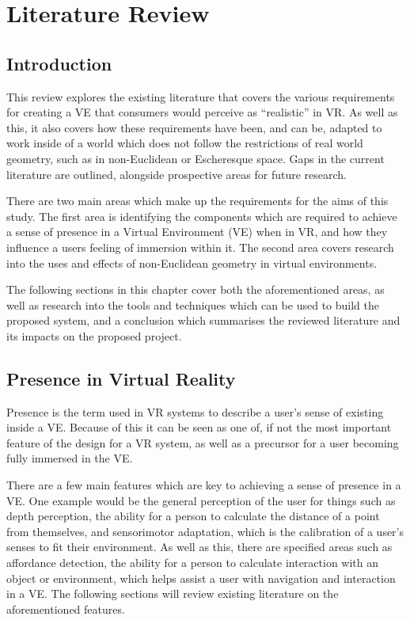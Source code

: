 \chapter{Literature Review}
\label{lr}

	\section{Introduction}
	\label{lr:intro}

		This review explores the existing literature that covers the various requirements for creating a VE that consumers would perceive as \enquote{realistic} in VR.
		As well as this, it also covers how these requirements have been, and can be, adapted to work inside of a world which does not follow the restrictions of real world geometry, such as in non-Euclidean or Escheresque space.
		Gaps in the current literature are outlined, alongside prospective areas for future research.

		There are two main areas which make up the requirements for the aims of this study.
		The first area is identifying the components which are required to achieve a sense of presence in a Virtual Environment (VE) when in VR, and how they influence a users feeling of immersion within it.
		The second area covers research into the uses and effects of non-Euclidean geometry in virtual environments. %

		The following sections in this chapter cover both the aforementioned areas, as well as research into the tools and techniques which can be used to build the proposed system, and a conclusion which summarises the reviewed literature and its impacts on the proposed project.

	\section{Presence in Virtual Reality}
	\label{lr:vr}

		Presence is the term used in VR systems to describe a user's sense of existing inside a VE. Because of this it can be seen as one of, if not the most important feature of the design for a VR system, as well as a precursor for a user becoming fully immersed in the VE.

		There are a few main features which are key to achieving a sense of presence in a VE. One example would be the general perception of the user for things such as depth perception, the ability for a person to calculate the distance of a point from themselves, and sensorimotor adaptation, which is the calibration of a user's senses to fit their environment.
		As well as this, there are specified areas such as affordance detection, the ability for a person to calculate interaction with an object or environment, which helps assist a user with navigation and interaction in a VE.
		The following sections will review existing literature on the aforementioned features.


